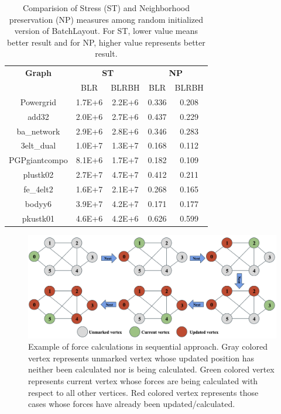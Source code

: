 \documentclass[conference]{article}
\newcommand{\toolname}{{BatchLayout}}
\begin{document}
\begin{table}%
\caption{Comparision of Stress (ST) and Neighborhood preservation (NP) measures among random initialized version of \toolname{}. For ST, lower value means better result and for NP, higher value represents better result. }
\centering
\begin{tabular}{|c|c|c|c|c|}
\hline
\multirow{1}{*}{\textbf{Graph}} & \multicolumn{2}{c|}{\textbf{ST}}                            & \multicolumn{2}{c|}{\textbf{NP}}            \\ \cline{2-5} 
                                & BLR       & BLRBH & BLR & BLRBH  \\ \hline

Powergrid	&	1.7E+6	&	2.2E+6	&	0.336 &		0.208\\ \hline
add32	&	2.0E+6	&	2.7E+6	&	0.437	&	0.229\\ \hline
ba\_network	&	2.9E+6	&	2.8E+6	&	0.346	&	0.283\\ \hline
3elt\_dual	&	1.0E+7 &	1.3E+7	&	0.168	&	0.112\\ \hline
PGPgiantcompo	&	8.1E+6 &		1.7E+7	&	0.182	&	0.109\\ \hline
plustk02	&	2.7E+7	&	4.7E+7	&	0.412	&	0.211\\ \hline
fe\_4elt2	&	1.6E+7	&	2.1E+7	&	0.268	&	0.165\\ \hline
bodyy6	&	3.9E+7	&	4.2E+7	&	0.171	&	0.177\\ \hline
pkustk01	&	4.6E+6	&	4.2E+6	&	0.626	&	0.599\\ \hline


\end{tabular}
\label{tab:measures_random_init}
\end{table}

\begin{figure}
    \centering
    \includegraphics[width=\linewidth]{figures/sgd.png}
    \caption{Example of force calculations in sequential approach. Gray colored vertex represents unmarked vertex whose updated position has neither been calculated nor is being calculated. Green colored vertex represents current vertex whose forces are being calculated with respect to all other vertices. Red colored vertex represents those cases whose forces have already been updated/calculated.}
    \label{fig:sgdfig}
\end{figure}
\end{document}
